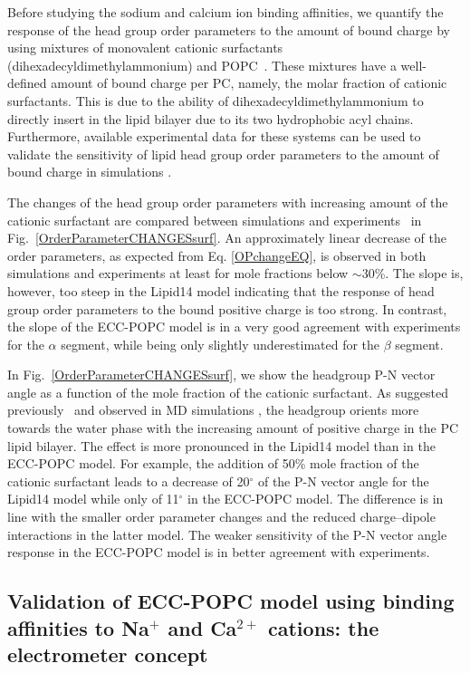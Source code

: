 \documentclass[journal=jpcbfk,manuscript=article]{achemso}
\begin{document}
Before studying the sodium and calcium ion binding affinities, we quantify the response of the head group order parameters to the amount of bound charge by using mixtures of monovalent cationic surfactants (dihexadecyldimethylammonium) and POPC~\cite{scherer89}. These mixtures have a well-defined amount of bound charge per PC, namely, the molar fraction of cationic surfactants. This is due to the ability of dihexadecyldimethylammonium to directly insert in the lipid bilayer due to its two hydrophobic acyl chains. Furthermore, available experimental data for these systems can be used to validate the sensitivity of lipid head group order parameters to the amount of bound charge in simulations \cite{scherer89}.

The changes of the head group order parameters with increasing amount of the cationic surfactant are compared between simulations and experiments~\cite{scherer89} in Fig.~\ref{OrderParameterCHANGESsurf}. An approximately linear decrease of the order parameters, as expected from Eq. \ref{OPchangeEQ}, is observed in both simulations and experiments at least for mole fractions below $\sim$30\%. The slope is, however, too steep in the Lipid14 model indicating that the response of head group order parameters to the bound positive charge is too strong. In contrast, the slope of the ECC-POPC model is in a very good agreement with experiments for the $\alpha$ segment, while being only slightly underestimated for the $\beta$ segment.

In Fig.~\ref{OrderParameterCHANGESsurf}, we show the headgroup P-N vector angle as a function of the mole fraction of the cationic surfactant.
As suggested previously~\cite{seelig87} and observed in MD simulations \cite{cordomi08,cordomi09,gurtovenko05,zhao12}, the headgroup orients
more towards the water phase with the increasing amount of positive charge in
the PC lipid bilayer. The effect is more pronounced in the Lipid14 model than in the ECC-POPC model.   For example, the addition of 50\% mole fraction of the cationic surfactant leads to a decrease of 20$^{\circ}$ of the P-N vector angle for the Lipid14 model while only of 11$^{\circ}$ in the ECC-POPC model. The difference is in line with the smaller order parameter changes and the reduced charge--dipole interactions in the latter model. The weaker sensitivity of the P-N vector angle response in the ECC-POPC model is in better agreement with experiments.


\subsection{Validation of ECC-POPC model using binding affinities to Na$^+$ and Ca$^{2+}$ cations: the electrometer concept}
\end{document}
